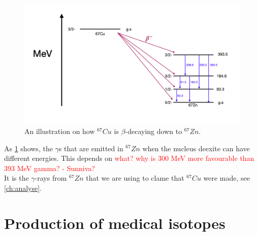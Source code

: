 \documentclass[twoside,english]{uiofysmaster/uiofysmaster}
\begin{document}
\begin{figure}[h!]
    \centering
     \includegraphics[scale=0.4]{67Cu_decay.PNG}
     \caption{An illustration on how $^{67}Cu$ is $\beta$-decaying down to $^{67}Zn$. } 
    \label{fig:67cu_decay}
\end{figure}
\noindent
As \ref{fig:67cu_decay} shows, the $\gamma$s that are emitted in $^{67}Zn$ when the nucleus deexite can have different energies. This depends on \textcolor{red}{what? why is 300 MeV more favourable than 393 MeV gamma? - Sunniva?}
\\
It is the $\gamma$-rays from $^{67}Zn$ that we are using to clame that $^{67}Cu$ were made, see \ref{ch:analyse}.


\section{Production of medical isotopes}
\end{document}
